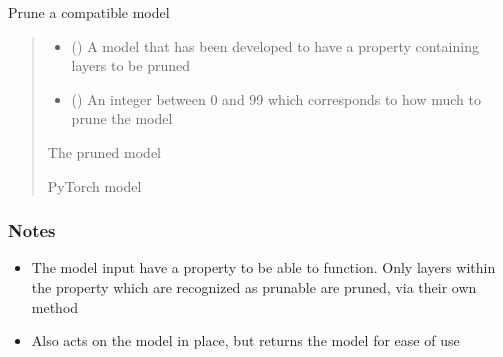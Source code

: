 \documentclass[letterpaper,10pt,english]{sphinxmanual}
\begin{document}
\begin{fulllineitems}
\label{\detokenize{beyondml.pt.utils:beyondml.pt.utils.utils.prune_model}}
\pysigstartsignatures
{}
\pysigstopsignatures
\sphinxAtStartPar
Prune a compatible model
\begin{quote}\begin{description}
\begin{itemize}
\item {} 
\sphinxAtStartPar
{} () \textendash{} A model that has been developed to have a  property containing layers to be pruned

\item {} 
\sphinxAtStartPar
{} () \textendash{} An integer between 0 and 99 which corresponds to how much to prune the model

\end{itemize}

\sphinxAtStartPar
{} \textendash{} The pruned model

\sphinxAtStartPar
PyTorch model

\end{description}\end{quote}
\subsubsection*{Notes}
\begin{itemize}
\item {} 
\sphinxAtStartPar
The model input  have a  property to be able to function. Only layers within the
 property which are recognized as prunable are pruned, via their own  method

\item {} 
\sphinxAtStartPar
Also acts on the model in place, but returns the model for ease of use

\end{itemize}

\end{fulllineitems}
\end{document}
